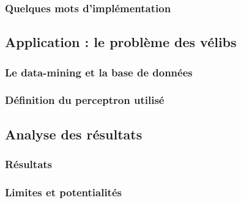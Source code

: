 \documentclass[a4paper, 11pt]{article}
\begin{document}
	\subsubsection{Quelques mots d'implémentation}
\subsection{Application : le problème des vélibs}
	\subsubsection{Le data-mining et la base de données}
	\subsubsection{Définition du perceptron utilisé}
\subsection{Analyse des résultats}
	\subsubsection{Résultats}
	\subsubsection{Limites et potentialités}
	
 
\end{document}
